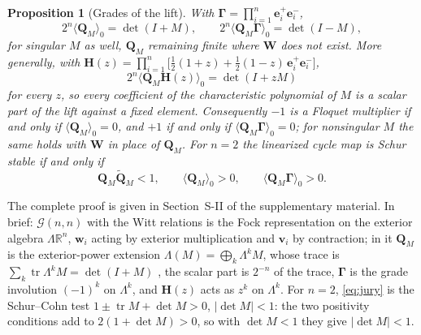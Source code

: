 \documentclass[journal]{IEEEtran}
\newtheorem{proposition}{Proposition}
\newcommand{\Gnn}{\mathcal{G}(n,n)}
\newcommand{\rev}[1]{\widetilde{#1}}
\begin{document}
\begin{proposition}[Grades of the lift]
\label{prop:grades}
With $\bm{\Gamma}=\prod_{i=1}^{n}\bm{e}^{+}_i\bm{e}^{-}_i$,
\begin{equation}
2^{n}\langle\bm{Q}_M\rangle_0=\det(I+M),\qquad
2^{n}\langle\bm{Q}_M\bm{\Gamma}\rangle_0=\det(I-M),
\label{eq:grades}
\end{equation}
for singular $M$ as well, $\bm{Q}_M$ remaining finite where $\bm{W}$ does not
exist. More generally, with
$\bm{H}(z)=\prod_{i=1}^{n}\bigl[\tfrac12(1+z)+\tfrac12(1-z)\,\bm{e}^{+}_i\bm{e}^{-}_i\bigr]$,
\begin{equation}
2^{n}\langle\bm{Q}_M\bm{H}(z)\rangle_0=\det(I+zM)
\label{eq:charpoly}
\end{equation}
for every $z$, so every coefficient of the characteristic polynomial of $M$
is a scalar part of the lift against a fixed element. Consequently $-1$ is a
Floquet multiplier if and only if $\langle\bm{Q}_M\rangle_0=0$, and $+1$ if
and only if $\langle\bm{Q}_M\bm{\Gamma}\rangle_0=0$; for nonsingular $M$ the
same holds with $\bm{W}$ in place of $\bm{Q}_M$. For $n=2$ the linearized
cycle map is Schur stable if and only if
\begin{equation}
\bm{Q}_M\rev{\bm{Q}}_M<1,\qquad \langle\bm{Q}_M\rangle_0>0,\qquad
\langle\bm{Q}_M\bm{\Gamma}\rangle_0>0 .
\label{eq:jury}
\end{equation}
\end{proposition}

\begin{IEEEproof}
The complete proof is given in Section~S-II of the supplementary material. In
brief: $\Gnn$ with the Witt relations is
the Fock representation on the exterior algebra $\Lambda\mathbb{R}^{n}$,
$\bm{w}_i$ acting by exterior multiplication and $\bm{v}_i$ by contraction;
in it $\bm{Q}_M$ is the exterior-power extension
$\Lambda(M)=\bigoplus_k\Lambda^{k}M$, whose trace is
$\sum_k\operatorname{tr}\Lambda^{k}M=\det(I+M)$ \cite[Sec.~0.8.12]{horn2013matrix},
the scalar part is $2^{-n}$ of the trace, $\bm{\Gamma}$ is the grade involution
$(-1)^{k}$ on $\Lambda^{k}$, and $\bm{H}(z)$ acts as $z^{k}$ on $\Lambda^{k}$.
For $n=2$, \eqref{eq:jury} is the Schur--Cohn test
$1\pm\operatorname{tr}M+\det M>0$, $\lvert\det M\rvert<1$: the two
positivity conditions add to $2(1+\det M)>0$, so with $\det M<1$ they give
$\lvert\det M\rvert<1$.
\end{IEEEproof}
\end{document}
